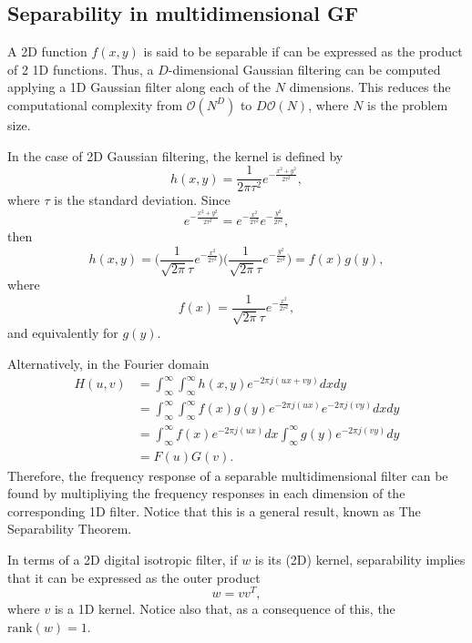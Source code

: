 \begin{subappendices}

\section{Separability in multidimensional GF}
\label{sec:GF_separability}

A 2D function $f(x,y)$ is said to be separable if can be expressed as
the product of 2 1D functions. Thus, a $D$-dimensional Gaussian
filtering can be computed applying a 1D Gaussian filter along each of
the $N$ dimensions. This reduces the computational complexity from
$\mathcal{O}(N^D)$ to $D\mathcal{O}(N)$, where $N$ is the problem
size.

In the case of 2D Gaussian filtering, the kernel is defined by
\begin{equation}
  h(x,y) = \frac{1}{2\pi\tau^2}e^{-\frac{x^2+y^2}{2\tau^2}},
  \label{eq:2DGF}
\end{equation}
where $\tau$ is the standard deviation. Since
\begin{equation*}
  e^{-\frac{x^2+y^2}{2\tau^2}} = e^{-\frac{x^2}{2\tau^2}}e^{-\frac{y^2}{2\tau^2}},
\end{equation*}
then
\begin{equation}
  h(x,y) = \Big(\frac{1}{\sqrt{2\pi}\tau}e^{-\frac{x^2}{2\tau^2}}\Big)\Big(\frac{1}{\sqrt{2\pi}\tau}e^{-\frac{y^2}{2\tau^2}}\Big) = f(x)g(y),
\end{equation}
where
\begin{equation}
  f(x) = \frac{1}{\sqrt{2\pi}\tau}e^{-\frac{x^2}{2\tau^2}},
\end{equation}
and equivalently for $g(y)$.

Alternatively, in the Fourier domain
\begin{equation*}
  \begin{split}
    H(u,v) & = \int_\infty^\infty\int_\infty^\infty h(x,y)e^{-2\pi j(ux+vy)}dxdy \\
           & = \int_\infty^\infty\int_\infty^\infty f(x)g(y)e^{-2\pi j(ux)}e^{-2\pi j(vy)}dxdy \\
           & = \int_\infty^\infty f(x)e^{-2\pi j(ux)} dx \int_\infty^\infty g(y) e^{-2\pi j(vy)} dy \\
           & = F(u)G(v).
  \end{split}
\end{equation*}
Therefore, the frequency response of a separable multidimensional
filter can be found by multipliying the frequency responses in each
dimension of the corresponding 1D filter. Notice that this is a
general result, known as The Separability Theorem.

In terms of a 2D digital isotropic filter, if $w$ is its (2D) kernel,
separability implies that it can be expressed as the outer product
\cite{gonzalez2009digital}
\begin{equation}
  w = vv^T,
\end{equation}
where $v$ is a 1D kernel. Notice also that, as a consequence of this,
the $\text{rank}(w)=1$.


\end{subappendices}